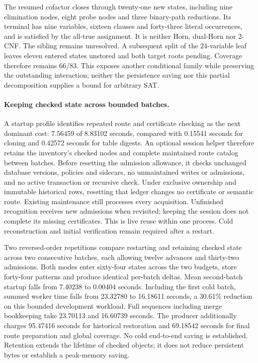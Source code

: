 \documentclass[11pt,a4paper]{article}
\numberwithin{equation}{section}
\theoremstyle{plain}
\theoremstyle{definition}
\theoremstyle{remark}
\begin{document}
The resumed cofactor closes through twenty-one new states, including nine elimination nodes, eight probe nodes and three binary-path reductions. Its terminal has nine variables, sixteen clauses and forty-three literal occurrences, and is satisfied by the all-true assignment. It is neither Horn, dual-Horn nor 2-CNF. The sibling remains unresolved. A subsequent split of the 24-variable leaf leaves eleven entered states unstored and both target roots pending. Coverage therefore remains 66/83. This exposes another conditional family while preserving the outstanding interaction; neither the persistence saving nor this partial decomposition supplies a bound for arbitrary SAT.

\paragraph{Keeping checked state across bounded batches.}
A startup profile identifies repeated route and certificate checking as the next dominant cost: 7.56459 of 8.83102 seconds, compared with 0.15541 seconds for cloning and 0.42572 seconds for table digests. An optional session helper therefore retains the inventory's checked nodes and complete maintained route catalog between batches. Before resetting the admission allowance, it checks unchanged database versions, policies and sidecars, no unmaintained writes or admissions, and no active transaction or recursive check. Under exclusive ownership and immutable historical rows, resetting that ledger changes no certificate or semantic route. Existing maintenance still processes every acquisition. Unfinished recognition receives new admissions when revisited; keeping the session does not complete its missing certificates. This is live reuse within one process. Cold reconstruction and initial verification remain required after a restart.

Two reversed-order repetitions compare restarting and retaining checked state across two consecutive batches, each allowing twelve advances and thirty-two admissions. Both modes enter sixty-four states across the two budgets, store forty-four patterns and produce identical per-batch deltas. Mean second-batch startup falls from 7.40238 to 0.00404 seconds. Including the first cold batch, summed worker time falls from 23.32780 to 16.18611 seconds, a 30.61\% reduction on this bounded development workload. Full sequences including merge bookkeeping take 23.70113 and 16.60739 seconds. The producer additionally charges 95.47416 seconds for historical restoration and 69.18542 seconds for final route preparation and global coverage. No cold end-to-end saving is established. Retention extends the lifetime of checked objects; it does not reduce persistent bytes or establish a peak-memory saving.
\end{document}
